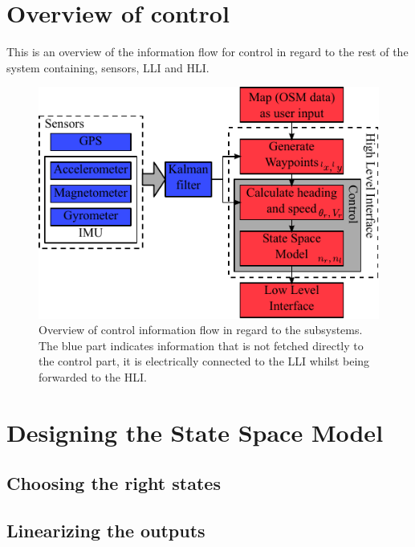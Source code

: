 \section{Overview of control}
\label{sc:control}
This is an overview of the information flow for control in regard to the rest of the system containing, sensors, \ac{LLI} and \ac{HLI}.

\begin{figure}[htbp]
	\centering
	\includegraphics[width=\textwidth]{img/vessel-block-overview}
	\caption{Overview of control information flow in regard to the subsystems. The blue part indicates information that is not fetched directly to the control part, it is electrically connected to the \ac{LLI} whilst being forwarded to the \ac{HLI}.}
	\label{fig:vessel-block-overview}
\end{figure}


\section{Designing the State Space Model}

\subsection{Choosing the right states}


\subsection{Linearizing the outputs}

